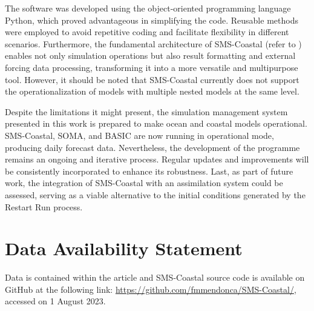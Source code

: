 The software was developed using the object-oriented programming language Python, which proved advantageous in simplifying the code. Reusable methods were employed to avoid repetitive coding and facilitate flexibility in different scenarios. Furthermore, the fundamental architecture of SMS-Coastal (refer to ) enables not only simulation operations but also result formatting and external forcing data processing, transforming it into a more versatile and multipurpose tool. However, it should be noted that SMS-Coastal currently does not support the operationalization of models with multiple nested models at the same level.

Despite the limitations it might present, the simulation management system presented in this work is prepared to make ocean and coastal models operational. SMS-Coastal, SOMA, and BASIC are now running in operational mode, producing daily forecast data. Nevertheless, the development of the programme remains an ongoing and iterative process. Regular updates and improvements will be consistently incorporated to enhance its robustness. Last, as part of future work, the integration of SMS-Coastal with an assimilation system could be assessed, serving as a viable alternative to the initial conditions generated by the Restart Run process.

\section{Data Availability Statement} \label{sec:cp4_github}
Data is contained within the article and SMS-Coastal source code is available on GitHub at the following link: \href{https://github.com/fmmendonca/SMS-Coastal/}{https://github.com/fmmendonca/SMS-Coastal/}, accessed on 1 August 2023.
